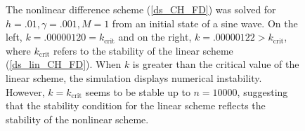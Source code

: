 \documentclass[12pt, reqno]{report}
\theoremstyle{definition}
\theoremstyle{remark}
\begin{document}
\begin{figure}[H]
\begin{tabular}{cc}
    \end{tabular}

    \caption{The nonlinear difference scheme (\ref{ds_CH_FD}) was solved for $h=.01,\gamma=.001,M=1$ from an initial state of a sine wave. 
    On the left, $k=.00000120=k_\text{crit}$ and on the right, $k=.00000122>k_\text{crit}$, where $k_\text{crit}$ refers to the stability of the linear scheme (\ref{ds_lin_CH_FD}). 
    When $k$ is greater than the critical value of the linear scheme, the simulation displays numerical instability. 
    However, $k=k_\text{crit}$ seems to be stable up to $n=10000$, suggesting that the stability condition for the linear scheme reflects the stability of the nonlinear scheme.}

    \label{fg_nonlinear_stability_CH}
\end{figure}
\end{document}
